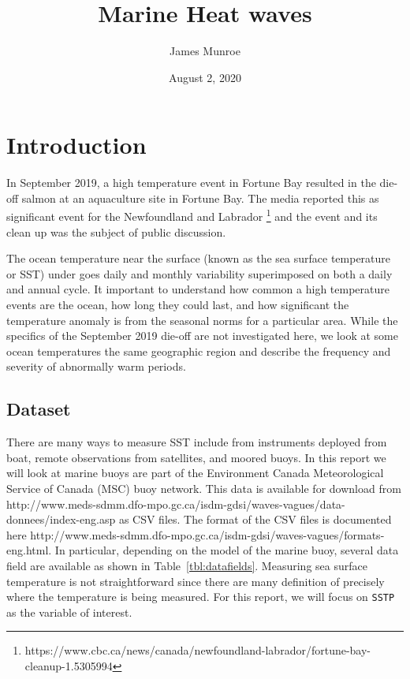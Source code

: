 \documentclass[12pt, letterpaper]{article}
\title{Marine Heat waves}
\author{James Munroe}
\date{August 2, 2020}
\begin{document}
\maketitle

\section{Introduction}

In September 2019, a high temperature event in Fortune Bay resulted in the die-off salmon at an aquaculture site in Fortune Bay. The media reported this as significant event for the Newfoundland and Labrador \footnote{https://www.cbc.ca/news/canada/newfoundland-labrador/fortune-bay-cleanup-1.5305994} and the event and its clean up was the subject of public discussion. 
 
The ocean temperature near the surface (known as the sea surface temperature or SST) under goes daily and monthly variability superimposed on both a daily and annual cycle.  It important to understand how common a high temperature events are the ocean, how long they could last, and how significant the temperature anomaly is from the seasonal norms for a particular area.  While the specifics of the September 2019 die-off are not investigated here, we look at some ocean temperatures the same geographic region and describe the frequency and severity of abnormally warm periods.

\subsection{Dataset}

There are many ways to measure SST include from instruments deployed from boat, remote observations from satellites, and moored buoys.  In this report we will look at marine buoys are part of the Environment Canada Meteorological Service of Canada (MSC) buoy network.  This data is available for download from http://www.meds-sdmm.dfo-mpo.gc.ca/isdm-gdsi/waves-vagues/data-donnees/index-eng.asp as CSV files. The format of the CSV files is documented here http://www.meds-sdmm.dfo-mpo.gc.ca/isdm-gdsi/waves-vagues/formats-eng.html. In particular, depending on the model of the marine buoy, several data field are available as shown in Table~\ref{tbl:datafields}. Measuring sea surface temperature is not straightforward since there are many definition of precisely where the temperature is being measured.  For this report, we will focus on \texttt{SSTP} as the variable of interest.
\end{document}
